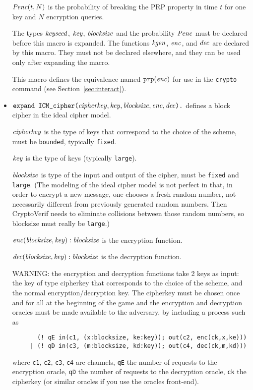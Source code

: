 \documentclass{article}
\begin{document}
\begin{itemize}
   $\mathit{Penc}(t, N)$ is the probability of breaking the PRP property
   in time $t$ for one key and $N$ encryption queries.

   The types $\mathit{keyseed}$, $\mathit{key}$, $\mathit{blocksize}$ and the probability $\mathit{Penc}$ must
   be declared before this macro is expanded. The functions
   $\mathit{kgen}$, $\mathit{enc}$, and $\mathit{dec}$ are declared by this
   macro. They must not be declared elsewhere, and they can be used
   only after expanding the macro.

   This macro defines the equivalence named $\texttt{prp}(\mathit{enc})$
   for use in the \texttt{crypto} command 
   (see Section~\ref{sec:interact}).

\item $\texttt{expand ICM\_cipher(}\vn{cipherkey}, \vn{key}, \vn{blocksize}, \vn{enc},
   \vn{dec}%
\texttt{).}$
   defines a block cipher in the ideal cipher model.

   $\mathit{cipherkey}$ is the type of keys that correspond to the choice of the scheme, must be \texttt{bounded}, typically \texttt{fixed}.

   $\mathit{key}$ is the type of keys (typically \texttt{large}).

   $\mathit{blocksize}$ is type of the input and output of the cipher, 
   must be \texttt{fixed} and \texttt{large}.
   (The modeling of the ideal cipher model is not perfect in that, in
   order to encrypt a new message, one chooses a fresh random number,
   not necessarily different from previously generated random
   numbers. Then CryptoVerif needs to eliminate collisions between
   those random numbers, so blocksize must really be \texttt{large}.)

   $\mathit{enc}(\mathit{blocksize}, \mathit{key}): \mathit{blocksize}$ is the encryption function.

   $\mathit{dec}(\mathit{blocksize}, \mathit{key}): \mathit{blocksize}$ is the decryption function.

   WARNING: the encryption and decryption functions take 2 keys as
   input: the key of type cipherkey that corresponds to the choice of
   the scheme, and the normal encryption/decryption key. The cipherkey
   must be chosen once and for all at the beginning of the game and
   the encryption and decryption oracles must be made available to the
   adversary, by including a process such as
\begin{verbatim}
       (! qE in(c1, (x:blocksize, ke:key)); out(c2, enc(ck,x,ke)))
     | (! qD in(c3, (m:blocksize, kd:key)); out(c4, dec(ck,m,kd)))
\end{verbatim}
   where \texttt{c1}, \texttt{c2}, \texttt{c3}, \texttt{c4} are channels, 
   \texttt{qE} the number of requests to the encryption oracle,
   \texttt{qD} the number of requests to the decryption oracle,
   \texttt{ck} the cipherkey (or similar oracles if you use the oracles
   front-end).
 

\end{itemize}
\end{document}
